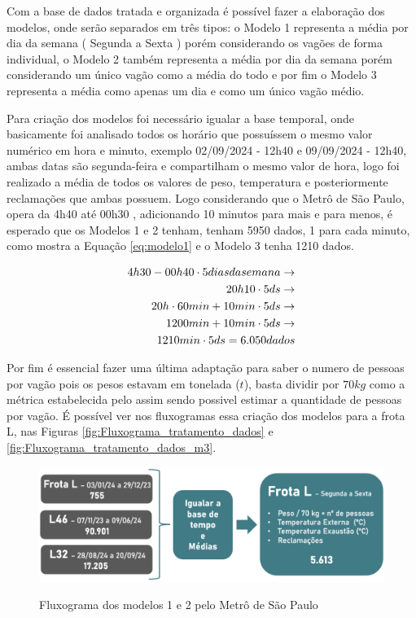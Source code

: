 \documentclass[acronym,symbols,table]{fei}
\begin{document}
Com a base de dados tratada e organizada é possível fazer a elaboração dos modelos, onde serão separados em três tipos: o Modelo 1 representa a média por dia da semana ( Segunda a Sexta ) porém considerando os vagões de forma individual, o Modelo 2 também representa a média por dia da semana porém considerando um único vagão como a média do todo e por fim o Modelo 3 representa a média como apenas um dia e como um único vagão médio.

Para criação dos modelos foi necessário igualar a base temporal, onde basicamente foi analisado todos os horário que possuíssem o mesmo valor numérico em hora e minuto, exemplo 02/09/2024 - 12h40 e 09/09/2024  - 12h40, ambas datas são segunda-feira e compartilham o mesmo valor de hora, logo foi realizado a média de todos os valores de peso, temperatura e posteriormente reclamações que ambas possuem. Logo considerando que o Metrô de São Paulo, opera da 4h40 até 00h30 \cite{horariosmetro}, adicionando 10 minutos para mais e para menos, é esperado que os Modelos 1 e 2 tenham, tenham 5950 dados, 1 para cada minuto, como mostra a Equação \ref{eq:modelo1} e o Modelo 3 tenha 1210 dados.

\begin{equation} \label{eq:modelo1}
    \begin{aligned}
{4h30} - {00h40} \cdot {5 \space dias \space da \space semana} \rightarrow \\ {20h10} \cdot {5ds} \rightarrow \\ {20h} \cdot {60min} + {10min} \cdot {5ds} \rightarrow \\ {1200min} + {10min} \cdot {5ds} \rightarrow \\ {1210min} \cdot {5ds}  = {6.050\space dados}
    \end{aligned}
\end{equation}

Por fim é essencial fazer uma última adaptação para saber o numero de pessoas por vagão pois os pesos estavam em tonelada ($t$), basta dividir por $70kg$ como a métrica estabelecida pelo \textcite{metrosp2024} assim sendo possivel estimar a quantidade de pessoas por vagão. É possível ver nos fluxogramas essa criação dos modelos para a frota L, nas Figuras \ref{fig:Fluxograma_tratamento_dados} e \ref{fig:Fluxograma_tratamento_dados_m3}.

\begin{figure}[!htb]
    \centering
    \caption{Fluxograma dos modelos 1 e 2 pelo Metrô de São Paulo}
    \includegraphics[width=0.8\linewidth]{Imagens/Fluxograma_criacao_modelos.png}
    \label{fig:Fluxograma_tratamento_dados_m1_m2}
\end{figure}
\end{document}
